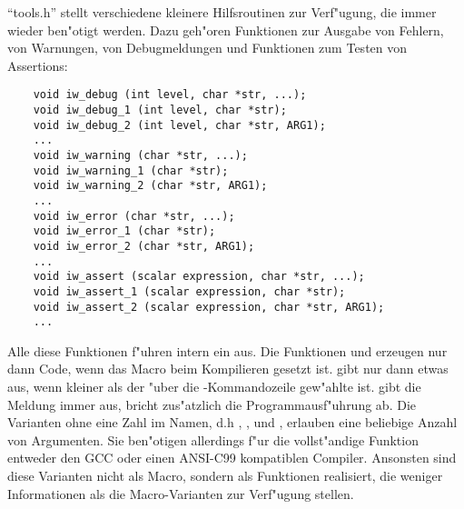 ``tools.h'' stellt verschiedene kleinere Hilfsroutinen zur
Verf"ugung, die immer wieder ben"otigt werden. Dazu geh"oren
Funktionen zur Ausgabe von Fehlern, von Warnungen, von
Debugmeldungen und Funktionen zum Testen von Assertions:
\begin{small}
\linespread{0.9}
\begin{verbatim}
    void iw_debug (int level, char *str, ...);
    void iw_debug_1 (int level, char *str);
    void iw_debug_2 (int level, char *str, ARG1);
    ...
    void iw_warning (char *str, ...);
    void iw_warning_1 (char *str);
    void iw_warning_2 (char *str, ARG1);
    ...
    void iw_error (char *str, ...);
    void iw_error_1 (char *str);
    void iw_error_2 (char *str, ARG1);
    ...
    void iw_assert (scalar expression, char *str, ...);
    void iw_assert_1 (scalar expression, char *str);
    void iw_assert_2 (scalar expression, char *str, ARG1);
    ...
\end{verbatim}
\end{small}
Alle diese Funktionen f"uhren intern ein  aus. Die
Funktionen  und 
erzeugen nur dann Code, wenn das Macro  beim Kompilieren
gesetzt ist.  gibt nur dann etwas aus, wenn
 kleiner als der "uber die \icewing-Kommandozeile
gew"ahlte  ist.  gibt die
Meldung immer aus,  bricht zus"atzlich die
Programmausf"uhrung ab. Die Varianten ohne eine Zahl im Namen, d.h
, ,  und
, erlauben eine beliebige Anzahl von
Argumenten. Sie ben"otigen allerdings f"ur die vollst"andige
Funktion entweder den GCC oder einen ANSI-C99 kompatiblen
Compiler. Ansonsten sind diese Varianten nicht als Macro, sondern
als Funktionen realisiert, die weniger Informationen als die
Macro-Varianten zur Verf"ugung stellen.

